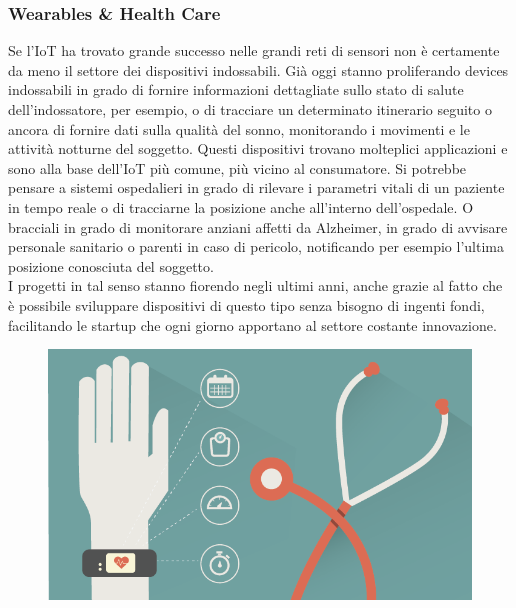 \subsubsection{Wearables \& Health Care}
Se l'IoT ha trovato grande successo nelle grandi reti di sensori non è certamente da meno il settore dei dispositivi indossabili. Già oggi stanno proliferando devices indossabili in grado di fornire informazioni dettagliate sullo stato di salute dell'indossatore, per esempio, o di tracciare un determinato itinerario seguito o ancora di fornire dati sulla qualità del sonno, monitorando i movimenti e le attività notturne del soggetto. Questi dispositivi trovano molteplici applicazioni e sono alla base dell'IoT più comune, più vicino al consumatore. Si potrebbe pensare a sistemi ospedalieri in grado di rilevare i parametri vitali di un paziente in tempo reale o di tracciarne la posizione anche all'interno dell'ospedale. O bracciali in grado di monitorare anziani affetti da Alzheimer, in grado di avvisare personale sanitario o parenti in caso di pericolo, notificando per esempio l'ultima posizione conosciuta del soggetto.
\\I progetti in tal senso stanno fiorendo negli ultimi anni, anche grazie al fatto che è possibile sviluppare dispositivi di questo tipo senza bisogno di ingenti fondi, facilitando le startup che ogni giorno apportano al settore costante innovazione.
\begin{figure}[H]
\centering
\includegraphics[scale=0.40]{immagini/wearable.png}
\end{figure}
